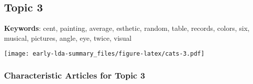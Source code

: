 \documentclass[
]{article}
\begin{document}
\newpage

\hypertarget{topic-3}{%
\subsection{Topic 3}\label{topic-3}}

\textbf{Keywords}: cent, painting, average, esthetic, random, table,
records, colors, six, musical, pictures, angle, eye, twice, visual

\texttt{[image: early-lda-summary\_files/figure-latex/cats-3.pdf]}
\newpage 

\hypertarget{characteristic-articles-for-topic-3}{%
\subsubsection{Characteristic Articles for Topic
3}\label{characteristic-articles-for-topic-3}}
\end{document}
